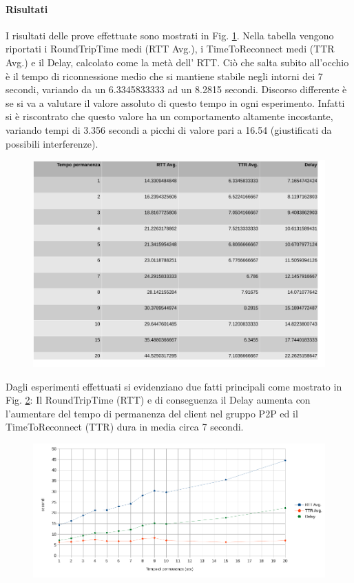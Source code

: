 \documentclass{llncs}
\begin{document}
\paragraph{Risultati} I risultati delle prove effettuate sono mostrati in Fig. \ref{report}. Nella tabella vengono riportati i RoundTripTime medi (RTT Avg.), i TimeToReconnect medi (TTR Avg.) e il Delay, calcolato come la metà dell' RTT. Ciò che salta subito all'occhio è il tempo di riconnessione medio che si mantiene stabile negli intorni dei 7 secondi, variando da un 6.3345833333 ad un 8.2815 secondi. Discorso differente è se si va a valutare il valore assoluto di questo tempo in ogni esperimento. Infatti si è riscontrato che questo valore ha un comportamento altamente incostante, variando tempi di 3.356 secondi a picchi di valore pari a 16.54 (giustificati da possibili interferenze).
\begin{figure}[H]
	\includegraphics[scale=0.3,center]{img/report.png}
	\caption{}
	\label{report}
\end{figure}
\noindent
Dagli esperimenti effettuati si evidenziano due fatti principali come mostrato in Fig. \ref{rtt}: Il RoundTripTime (RTT) e di conseguenza il Delay aumenta con l'aumentare del tempo di permanenza del client nel gruppo P2P ed il TimeToReconnect (TTR) dura in media circa 7 secondi.
\begin{figure}[H]
	\includegraphics[scale=0.5,center]{img/rtt.png}
	\caption{}
	\label{rtt}
\end{figure}
\noindent
	
\end{document}
